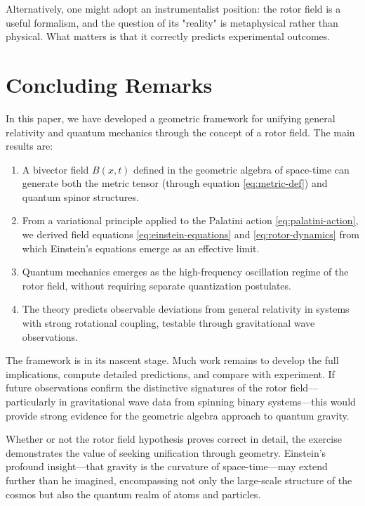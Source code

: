 \documentclass[11pt,a4paper]{article}
\numberwithin{equation}{section}
\theoremstyle{plain}
\theoremstyle{definition}
\theoremstyle{remark}
\begin{document}
Alternatively, one might adopt an instrumentalist position: the rotor field is a useful formalism, and the question of its "reality" is metaphysical rather than physical. What matters is that it correctly predicts experimental outcomes.

\section{Concluding Remarks}
\label{sec:conclusion}

In this paper, we have developed a geometric framework for unifying general relativity and quantum mechanics through the concept of a rotor field. The main results are:

\begin{enumerate}
  \item A bivector field $B(x,t)$ defined in the geometric algebra of space-time can generate both the metric tensor (through equation \eqref{eq:metric-def}) and quantum spinor structures.
  \item From a variational principle applied to the Palatini action \eqref{eq:palatini-action}, we derived field equations \eqref{eq:einstein-equations} and \eqref{eq:rotor-dynamics} from which Einstein's equations emerge as an effective limit.
  \item Quantum mechanics emerges as the high-frequency oscillation regime of the rotor field, without requiring separate quantization postulates.
  \item The theory predicts observable deviations from general relativity in systems with strong rotational coupling, testable through gravitational wave observations.
\end{enumerate}

The framework is in its nascent stage. Much work remains to develop the full implications, compute detailed predictions, and compare with experiment. If future observations confirm the distinctive signatures of the rotor field---particularly in gravitational wave data from spinning binary systems---this would provide strong evidence for the geometric algebra approach to quantum gravity.

Whether or not the rotor field hypothesis proves correct in detail, the exercise demonstrates the value of seeking unification through geometry. Einstein's profound insight---that gravity is the curvature of space-time---may extend further than he imagined, encompassing not only the large-scale structure of the cosmos but also the quantum realm of atoms and particles.
\end{document}
